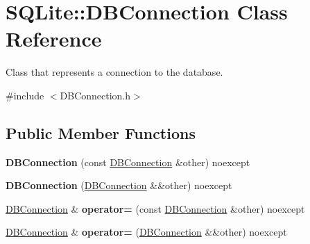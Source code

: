 \hypertarget{class_s_q_lite_1_1_d_b_connection}{\section{S\-Q\-Lite\-:\-:D\-B\-Connection Class Reference}
\label{class_s_q_lite_1_1_d_b_connection}
}


Class that represents a connection to the database.  




{\ttfamily \#include $<$D\-B\-Connection.\-h$>$}

\subsection*{Public Member Functions}
\begin{DoxyCompactItemize}
\item 
\hypertarget{class_s_q_lite_1_1_d_b_connection_ab3dbee23694c323481260b84ff901403}{{\bfseries D\-B\-Connection} (const \hyperlink{class_s_q_lite_1_1_d_b_connection}{D\-B\-Connection} \&other) noexcept}\label{class_s_q_lite_1_1_d_b_connection_ab3dbee23694c323481260b84ff901403}

\item 
\hypertarget{class_s_q_lite_1_1_d_b_connection_a41cc922e68047f709c25283b9d0176d5}{{\bfseries D\-B\-Connection} (\hyperlink{class_s_q_lite_1_1_d_b_connection}{D\-B\-Connection} \&\&other) noexcept}\label{class_s_q_lite_1_1_d_b_connection_a41cc922e68047f709c25283b9d0176d5}

\item 
\hypertarget{class_s_q_lite_1_1_d_b_connection_abf18d7c37cf19fe46af7b6c7c0f0e8f2}{\hyperlink{class_s_q_lite_1_1_d_b_connection}{D\-B\-Connection} \& {\bfseries operator=} (const \hyperlink{class_s_q_lite_1_1_d_b_connection}{D\-B\-Connection} \&other) noexcept}\label{class_s_q_lite_1_1_d_b_connection_abf18d7c37cf19fe46af7b6c7c0f0e8f2}

\item 
\hypertarget{class_s_q_lite_1_1_d_b_connection_a2d10766ea45bfb79f4959e62d432feeb}{\hyperlink{class_s_q_lite_1_1_d_b_connection}{D\-B\-Connection} \& {\bfseries operator=} (\hyperlink{class_s_q_lite_1_1_d_b_connection}{D\-B\-Connection} \&\&other) noexcept}\label{class_s_q_lite_1_1_d_b_connection_a2d10766ea45bfb79f4959e62d432feeb}


\end{DoxyCompactItemize}
